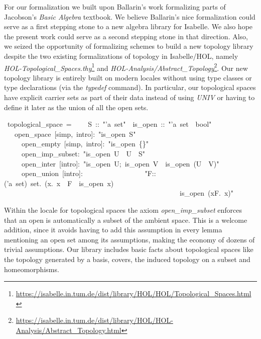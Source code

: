 \documentclass[12pt]{scrartcl}
\begin{document}
For our formalization we built upon Ballarin's work \cite{ballarin-exploring} formalizing parts of Jacobson's \textit{Basic Algebra} textbook. We believe Ballarin's nice formalization could serve as a first stepping stone to a new algebra library for Isabelle. We also hope the present work could serve as a second stepping stone in that direction. Also, we seized the opportunity of formalizing schemes to build a new topology library despite the two existing formalizations of topology in Isabelle/HOL, namely \textit{HOL-Topological\_Spaces.thy}\footnote{\url{https://isabelle.in.tum.de/dist/library/HOL/HOL/Topological_Spaces.html}} and \textit{HOL-Analysis/Abstract\_Topology}\footnote{\url{https://isabelle.in.tum.de/dist/library/HOL/HOL-Analysis/Abstract_Topology.html}}. Our new topology library is entirely built on modern locales without using type classes or type declarations (via the \textit{typedef} command). In particular, our topological spaces have explicit carrier sets as part of their data instead of using \textit{UNIV} or having to define it later as the union of all the open sets. 
\begin{isabelle}
\ topological\_space\ =\ \isanewline
\ \ \ S\ ::\ "'a\ set"\ \ is\_open\ ::\ "'a\ set\ \isasymRightarrow \ bool"\isanewline
\ \ \ open\_space\ [simp,\ intro]:\ "is\_open\ S"\ \isanewline
\ \ \ \ \ open\_empty\ [simp,\ intro]:\ "is\_open\ \{\}"\ \isanewline
\ \ \ \ \ open\_imp\_subset:\ "is\_open\ U\ \isasymLongrightarrow \ U\ \isasymsubseteq \ S"\isanewline
\ \ \ \ \ open\_inter\ [intro]:\ "\isasymlbrakk is\_open\ U;\ is\_open\ V\isasymrbrakk \ \isasymLongrightarrow \ is\_open\ (U\ \isasyminter \ V)"\ \isanewline
\ \ \ \ \ open\_union\ [intro]:\ \isanewline
\ \ \ \ \ \ \ \ \ \ \ \ \ \ \ \ "\isasymAnd F::('a\ set)\ set.\ (\isasymAnd x.\ x\ \isasymin \ F\ \isasymLongrightarrow \ is\_open\ x)\isanewline
\ \ \ \ \ \ \ \ \ \ \ \ \ \ \ \ \ \ \ \ \ \ \ \ \ \ \ \ \ \ \ \ \ \ \ \ \ \ \ \ \ \ \ \ \ \ \ \ \ \isasymLongrightarrow \ is\_open\ (\isasymUnion x\isasymin F.\ x)"
\end{isabelle}
Within the locale for topological spaces the axiom \textit{open\_imp\_subset} enforces that an open is automatically a subset of the ambient space. This is a welcome addition, since it avoids having to add this assumption in every lemma mentioning an open set among its assumptions, making the economy of dozens of trivial assumptions. Our library includes basic facts about topological spaces like the topology generated by a basis, covers, the induced topology on a subset and homeomorphisms. 
\end{document}
